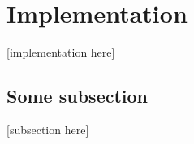 \section{Implementation}
\label{section:implementation}
[implementation here]

\subsection{Some subsection}
[subsection here]
